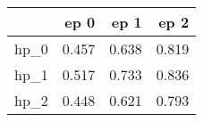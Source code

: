 \begin{tabular}{lrrr}
\toprule
{} &   ep 0 &   ep 1 &   ep 2 \\
\midrule
hp\_0 &  0.457 &  0.638 &  0.819 \\
hp\_1 &  0.517 &  0.733 &  0.836 \\
hp\_2 &  0.448 &  0.621 &  0.793 \\
\bottomrule
\end{tabular}
